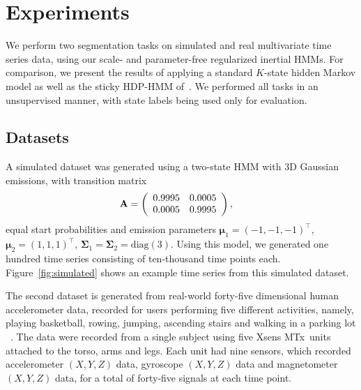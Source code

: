 \documentclass[letterpaper]{article}
\begin{document}
\section{Experiments}\label{sec:Experiments}

We perform two segmentation tasks on simulated and real multivariate time series
data, using our scale- and parameter-free regularized inertial HMMs. For
comparison, we present the results of applying a standard $K$-state hidden
Markov model as well as the sticky HDP-HMM of~\cite{fox2011sticky}. We
performed all tasks in an unsupervised manner, with state labels being used only
for evaluation.

\subsection{Datasets}\label{sec:datasets}

A simulated dataset was generated using a two-state HMM with 3D Gaussian emissions, with transition matrix
\begin{align*}
  \setlength{\abovedisplayskip}{0pt}
  \setlength{\belowdisplayskip}{0pt}
    \mathbf{A} &= \left( 
                   \begin{array}{ccc}
                    0.9995 & 0.0005 \\
                    0.0005 & 0.9995
                   \end{array}
                   \right),
\end{align*}
equal start probabilities and emission parameters $\mathbf{\mu}_1 = (-1, -1, -1)^\top$, $\mathbf{\mu}_2 = (1, 1, 1)^\top$, $\mathbf{\Sigma}_1 = \mathbf{\Sigma}_2 = \text{diag}(3)$. Using this model, we generated one hundred time series consisting of ten-thousand time points each. Figure~\ref{fig:simulated} shows an example time series from this simulated dataset.

The second dataset is generated from real-world forty-five dimensional human accelerometer data, recorded for users performing five different activities, namely, playing basketball, rowing, jumping, ascending stairs and walking in a parking lot ~\cite{Altun:2010:CSC:1823245.1823314}. The data were recorded from a single subject using five Xsens MTx\texttrademark\ units attached to the torso, arms and legs. Each unit had nine sensors, which recorded accelerometer $(X, Y, Z)$ data, gyroscope $(X,Y,Z)$ data and magnetometer $(X,Y,Z)$ data, for a total of forty-five signals at each time point.
\end{document}
